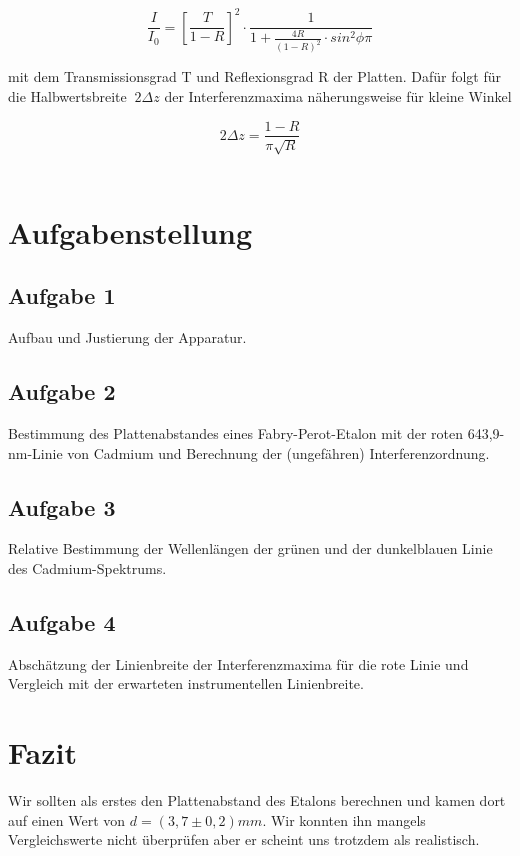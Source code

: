 \documentclass{article}
\begin{document}
\begin{equation}
\label{10}
\frac {I}{I_{0}} = \left [ \frac {T}{1-R} \right ]^2 \cdot \frac {1}{1+ \frac {4R}{(1-R)^2} \cdot sin^2 \phi \pi}
\end{equation}

mit dem Transmissionsgrad T und Reflexionsgrad R der Platten. Dafür folgt für die Halbwertsbreite \(\ 2 \Delta z \) der Interferenzmaxima näherungsweise für kleine Winkel

\begin{equation}
\label{11}
2 \Delta z= \frac {1-R}{\pi \sqrt {R}}
\end{equation}\\

\section{Aufgabenstellung}
\subsection*{Aufgabe 1}
Aufbau und Justierung der Apparatur.
\subsection*{Aufgabe 2}
Bestimmung des Plattenabstandes eines {\sc  Fabry-Perot-Etalon} mit der roten 643,9-nm-Linie von Cadmium und Berechnung der (ungefähren) Interferenzordnung.
\subsection*{Aufgabe 3}
Relative Bestimmung der Wellenlängen der grünen und der dunkelblauen Linie des Cadmium-Spektrums.
\subsection*{Aufgabe 4}
Abschätzung der Linienbreite der Interferenzmaxima für die rote Linie und Vergleich mit der erwarteten instrumentellen Linienbreite.

\newpage

\newpage






\section{Fazit}
Wir sollten als erstes den Plattenabstand des Etalons berechnen und kamen dort auf einen Wert von \(d=(3,7\pm 0,2)mm\). Wir konnten ihn mangels Vergleichswerte nicht überprüfen aber er scheint uns trotzdem als realistisch.\\
\end{document}
